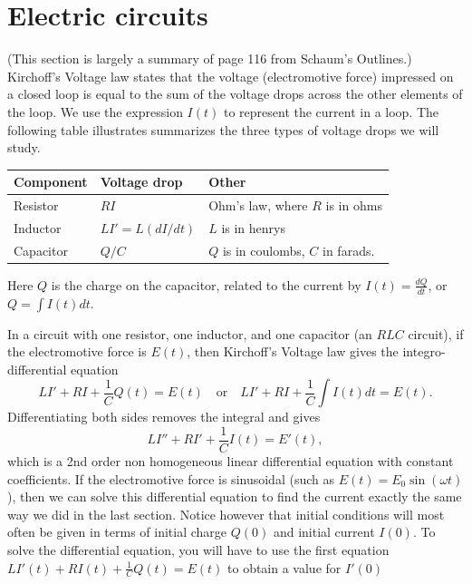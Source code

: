 \section{Electric circuits} (This section is largely a summary of page 116 from Schaum's Outlines.)
Kirchoff's Voltage law states that the voltage (electromotive force) impressed on a closed loop is equal to the sum of the voltage drops across the other elements of the loop. We use the expression $I(t)$ to represent the current in a loop. The following table illustrates summarizes the three types of voltage drops we will study.
\begin{center}
\begin{tabular}{|l|l|l|}
\hline
Component & Voltage drop & Other\\\hline
Resistor & $RI$ & Ohm's law, where $R$ is in ohms\\\hline
Inductor & $LI' = L(dI/dt)$ & $L$ is in henrys\\\hline
Capacitor& $Q/C$ & $Q$ is in coulombs, $C$ in farads.\\\hline
\end{tabular}
\end{center}
Here $Q$ is the charge on the capacitor, related to the current by $I(t)=\frac{dQ}{dt}$, or $Q=\int I(t) dt$.


In a circuit  with one resistor, one inductor, and one capacitor (an $RLC$ circuit), if the electromotive force is $E(t)$, then Kirchoff's Voltage law gives the integro-differential equation 
$$L I'+ RI+ \frac{1}{C}Q(t) =E(t) \quad \text{or}\quad L I'+ RI+ \frac{1}{C}\int I(t) dt = E(t).$$  
Differentiating both sides removes the integral and gives
$$L I''+ RI'+ \frac{1}{C}I(t) = E'(t),$$ which is a 2nd order non homogeneous linear differential equation with constant coefficients. 
If the electromotive force is sinusoidal (such as $E(t) = E_0\sin(\omega t)$), then we can solve this differential equation to find the current exactly the same way we did in the last section. Notice however that initial conditions will most often be given in terms of initial charge $Q(0)$ and initial current $I(0)$.  To solve the differential equation, you will have to use the first equation $ L I'(t)+ RI(t)+ \frac{1}{C}Q(t) =E(t)$ to obtain a value for $I'(0)$

